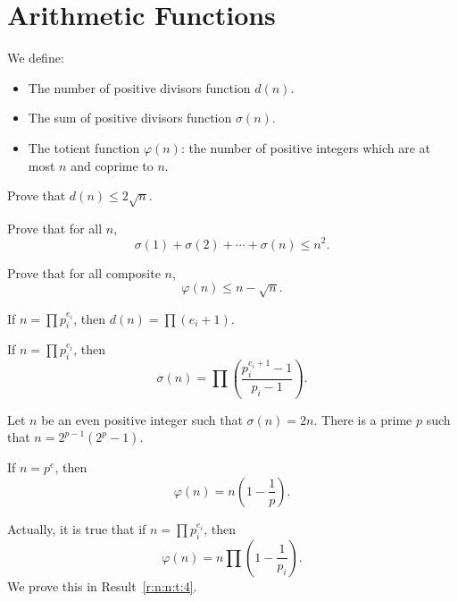 \section{Arithmetic Functions}
We define:
\begin{itemize}
    \item The number of positive divisors function $d(n)$.
    \item The sum of positive divisors function $\sigma(n)$.
    \item The totient function $\varphi(n)$: the number of positive integers
      which are at most $n$ and coprime to $n$.
\end{itemize}
\begin{problem}{\label{p:n:n:a:1}}
  Prove that $d(n)\le 2\sqrt n$.
\end{problem}
\begin{problem}{\label{p:n:n:a:2}}
  Prove that for all $n$,
    \[\sigma(1)+\sigma(2)+\cdots+\sigma(n)\le n^2.\]
\end{problem}
\begin{problem}{\label{p:n:n:a:3}}
  Prove that for all composite $n$,
    \[\varphi(n)\le n-\sqrt n.\]
\end{problem}
\begin{result}{\label{r:n:n:a:1}}
    If $n=\prod p_i^{e_i}$, then $d(n)=\prod(e_i+1)$.
\end{result}
\begin{result}{\label{r:n:n:a:2}}
    If $n=\prod p_i^{e_i}$, then
    \[\sigma(n)=\prod\left(\frac{p_i^{e_i+1}-1}{p_i-1}\right).\]
\end{result}
\begin{result}{\label{r:n:n:a:3}}
  Let $n$ be an even positive integer such that $\sigma(n)=2n$. There is a prime
  $p$ such that $n=2^{p-1}\left(2^p-1\right)$.
\end{result}
\begin{result}{\label{r:n:n:a:4}}
    If $n=p^e$, then
    \[\varphi(n)=n\left(1-\frac 1p\right).\]
\end{result}
Actually, it is true that if $n=\prod p_i^{e_i}$, then
\[\varphi(n)=n\prod\left(1-\frac 1{p_i}\right).\]
We prove this in Result~\ref{r:n:n:t:4}.
